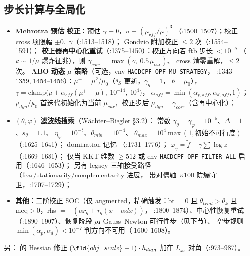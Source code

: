 \subsection{步长计算与全局化}
\begin{itemize}
  \item \textbf{Mehrotra 预估-校正}：预估 $\gamma=0$，$\sigma=(\mu_{aff}/\mu)^3$
        （:1500--1507）；校正 cross 项限幅 $\pm0.1\gamma$（:1513--1518）；
        Gondzio 附加校正 $\le2$ 次（:1554--1591）；
        \textbf{校正器再中心化重试}（:1375--1450）：校正方向若 ftb 步长 $<10^{-9}$
        （$\kappa\sim1/\mu$ 爆炸征兆），则 $\gamma_{corr}=\max(\gamma,\ 0.5\,\mu_{cur})$、
        cross 清零重解，$\le2$ 次。
        \textbf{ABO 动态 $\mu$ 策略}（可选，env \texttt{HACDCPF\_OPF\_MU\_STRATEGY}，
        :1343--1359, 1454--1456）：$\mu^+=\mu^2/\mu_0$（$\theta_S$ 更新，$\gamma_q=1$，
        $b=\mu_0$），$\gamma=\mathrm{clamp}\big(\mu+\alpha_{aff}(\mu^+-\mu),\ 10^{-14},\ 10^4\big)$，
        $\alpha_{aff}=\min(\alpha_{p,aff},\alpha_{d,aff},1)$；
        $\mu_{dyn}/\mu_0$ 首迭代初始化为当前 $\mu_{cur}$，校正步后
        $\mu_{dyn}=\gamma_{corr}$（含再中心化）；
  \item \textbf{$(\theta,\varphi)$ 滤波线搜索}（Wächter--Biegler §3.2）：
        常数 $\gamma_\theta=\gamma_\varphi=10^{-5}$、$\Delta=1$、$s_\theta=1.1$、
        $\eta_\varphi=10^{-8}$、$\theta_{min}=10^{-4}$、
        $\theta_{max}=10^4\max(1,\text{初始不可行度})$（:1625--1641）；
        domination 记忆 （:1731--1776）；
        $\varphi_\gamma=\tilde f-\gamma\sum\log z$（:1669--1681）；
        仅当 KKT 维数 $\ge512$ 或 env \texttt{HACDCPF\_OPF\_FILTER\_ALL} 启用（:1646--1653）；
        另有 legacy 三轴接受路径（feas/stationarity/complementarity 进展，
        带对偶轴 $\times100$ 防爆守卫，:1707--1729）；
  \item \textbf{其他}：二阶校正 SOC（仅 augmented，精确触发：bt==0 且
        $\theta_{trial}>\theta_k$ 且 meq$>$0，rhs $=-(\alpha r_g+r_g(x+\alpha dx))$，
        :1800--1874）、中心性恢复重试（:1890--1907）、恢复阶段 $\rho I$
        Gauss--Newton 可行性步（见下节）、
        空步规则 $\min(\alpha_p,\alpha_d)<10^{-7}$ 判方向不可用（:1600--1608）。
\end{itemize}
另： 的 Hessian 修正 $(\fld{obj\_scale}-1)\cdot h_{diag}$ 加在
$L_{xx}$ 对角（:973--987）。

